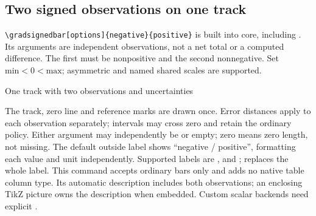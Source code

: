 \subsection{Two signed observations on one track}
\verb|\gradsignedbar[options]{negative}{positive}| is built into core,
including . Its arguments are independent observations, not
a net total or a computed difference. The first must be nonpositive and the
second nonnegative. Set $\mathrm{min}<0<\mathrm{max}$; asymmetric and named
shared scales are supported.
\begin{demo}{One track with two observations and uncertainties}


\end{demo}
The track, zero line and reference marks are drawn once. Error distances apply to
each observation separately; intervals may cross zero and retain the ordinary
 policy. Either argument may independently be  or empty;
zero means zero length, not missing. The default outside label shows
``negative / positive'', formatting each value and unit independently. Supported
labels are ,  and ;  replaces the whole
label. This command accepts ordinary bars only and adds no native table column
type. Its automatic description includes both observations; an enclosing TikZ
picture owns the description when embedded. Custom scalar backends need explicit
.
